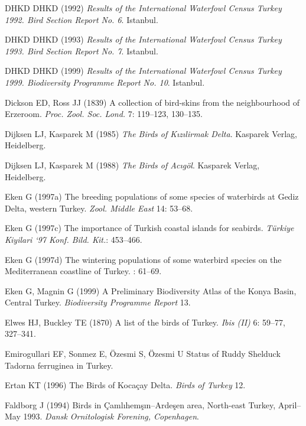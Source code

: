\documentclass[
  letterpaper,
  DIV=11,
  numbers=noendperiod]{scrreprt}
\newlength{\cslhangindent}
\newenvironment{CSLReferences}[2] %
 {\begin{list}{}{%
  \setlength{\itemindent}{0pt}
  \setlength{\leftmargin}{0pt}
  \setlength{\parsep}{0pt}
  \ifodd #1
   \setlength{\leftmargin}{\cslhangindent}
   \setlength{\itemindent}{-1\cslhangindent}
  \fi
  \setlength{\itemsep}{#2\baselineskip}}}
 {\end{list}}
\begin{document}
\begin{CSLReferences}{0}{1}
DHKD DHKD (1992) \emph{{Results of the International Waterfowl Census
Turkey 1992. Bird Section Report No. 6}}. Istanbul.

DHKD DHKD (1993) \emph{{Results of the International Waterfowl Census
Turkey 1993. Bird Section Report No. 7}}. Istanbul.

DHKD DHKD (1999) \emph{{Results of the International Waterfowl Census
Turkey 1999. Biodiversity Programme Report No. 10}}. Istanbul.

Dickson ED, Ross JJ (1839) {A collection of bird-skins from the
neighbourhood of Erzeroom}. \emph{Proc. Zool. Soc. Lond.} 7: 119--123,
130--135.

Dijksen LJ, Kasparek M (1985) \emph{{The Birds of Kızılirmak Delta}}.
Kasparek Verlag, Heidelberg.

Dijksen LJ, Kasparek M (1988) \emph{{The Birds of Acıgöl}}. Kasparek
Verlag, Heidelberg.

Eken G (1997a) {The breeding populations of some species of waterbirds
at Gediz Delta, western Turkey}. \emph{Zool. Middle East} 14: 53--68.

Eken G (1997c) {The importance of Turkish coastal islands for seabirds}.
\emph{Türkiye Kiyilari `97 Konf. Bild. Kit.}: 453--466.

Eken G (1997d) {The wintering populations of some waterbird species on
the Mediterranean coastline of Turkey}. : 61--69.

Eken G, Magnin G (1999) {A Preliminary Biodiversity Atlas of the Konya
Basin, Central Turkey}. \emph{Biodiversity Programme Report} 13.

Elwes HJ, Buckley TE (1870) {A list of the birds of Turkey}. \emph{Ibis
(II)} 6: 59--77, 327--341.

Emirogullari EF, Sonmez E, Özesmi S, Özesmi U {Status of Ruddy Shelduck
Tadorna ferruginea in Turkey}.

Ertan KT (1996) {The Birds of Kocaçay Delta}. \emph{Birds of Turkey} 12.

Faldborg J (1994) {Birds in Çamlıhemşın--Ardeşen area, North-east
Turkey, April--May 1993}. \emph{Dansk Ornitologisk Forening,
Copenhagen}.


\end{CSLReferences}
\end{document}
